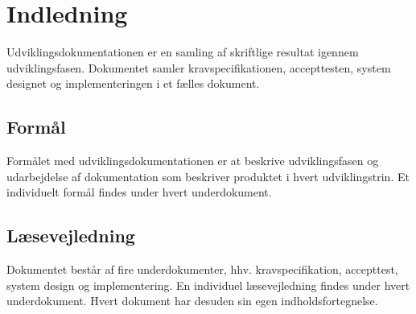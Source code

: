 \chapter*{Indledning}
Udviklingsdokumentationen er en samling af skriftlige resultat igennem udviklingsfasen. Dokumentet samler kravspecifikationen, accepttesten, system designet og implementeringen i et fælles dokument. 

\section*{Formål}
Formålet med udviklingsdokumentationen er at beskrive udviklingsfasen og udarbejdelse af dokumentation som beskriver produktet i hvert udviklingstrin. Et individuelt formål findes under hvert underdokument. 

\section*{Læsevejledning}
Dokumentet består af fire underdokumenter, hhv. kravspecifikation, accepttest, system design og implementering. En individuel læsevejledning findes under hvert underdokument. Hvert dokument har desuden sin egen indholdsfortegnelse. 